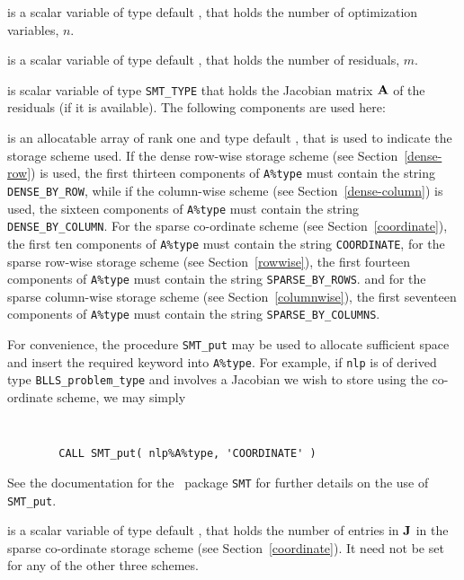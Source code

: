 \documentclass{galahad}
\newcommand{\packagename}{BLLS}
\begin{document}
\begin{description}

 is a scalar variable of type default \integer,
 that holds the number of optimization variables, $n$.

 is a scalar variable of type default \integer,
 that holds the number of residuals, $m$.

 is scalar variable of type {\tt SMT\_TYPE}
that holds the Jacobian matrix ${\mathbf{A}}$ of the residuals (if it is available).
The following components are used here:

\begin{description}

 is an allocatable array of rank one and type default
\character, that
is used to indicate the storage scheme used. If the dense row-wise
storage scheme (see Section~\ref{dense-row}) is used,
the first thirteen components of {\tt A\%type} must contain the
string {\tt DENSE\_BY\_ROW}, while if the column-wise scheme
(see Section~\ref{dense-column}) is used,
the sixteen components of {\tt A\%type} must contain the
string {\tt DENSE\_BY\_COLUMN}.
For the sparse co-ordinate scheme (see Section~\ref{coordinate}),
the first ten components of {\tt A\%type} must contain the
string {\tt COORDINATE},
for the sparse row-wise storage scheme (see Section~\ref{rowwise}),
the first fourteen components of {\tt A\%type} must contain the
string {\tt SPARSE\_BY\_ROWS}.
and for the sparse column-wise storage scheme (see Section~\ref{columnwise}),
the first seventeen components of {\tt A\%type} must contain the
string {\tt SPARSE\_BY\_COLUMNS}.

For convenience, the procedure {\tt SMT\_put}
may be used to allocate sufficient space and insert the required keyword
into {\tt A\%type}.
For example, if {\tt nlp} is of derived type {\tt \packagename\_problem\_type}
and involves a Jacobian we wish to store using the co-ordinate scheme,
we may simply
{\tt
\begin{verbatim}
        CALL SMT_put( nlp%A%type, 'COORDINATE' )
\end{verbatim}
}
\noindent
See the documentation for the \galahad\ package {\tt SMT}
for further details on the use of {\tt SMT\_put}.

 is a scalar variable of type default \integer, that
holds the number of entries in ${\mathbf{J}}$
in the sparse co-ordinate storage scheme (see Section~\ref{coordinate}).
It need not be set for any of the other three schemes.


\end{description}
\end{description}
\end{document}
